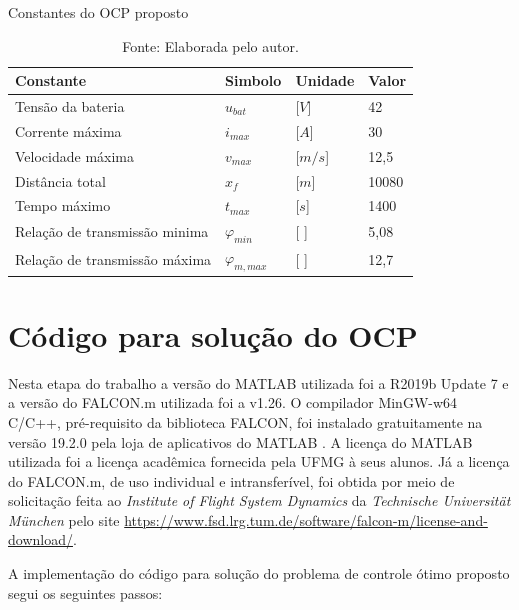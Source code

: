 \begin{table}[H]
	\centering
	\caption{Constantes do OCP proposto}
	\begin{tabular}{llll}
		\toprule
		\textbf{Constante} & \textbf{Simbolo} & \textbf{Unidade} & \textbf{Valor}\\
		\hline
		Tensão da bateria   & $u_{bat}$     & [$V$]    & 42    \\
        Corrente máxima     & $i_{max}$     & [$A$]    & 30    \\
        Velocidade máxima   & $v_{max}$     & [$m/s$]  & 12,5  \\  
        Distância total     & $x_f$         & [$m$]    & 10080 \\
        Tempo máximo        & $t_{max}$         & [$s$]    & 1400  \\
        Relação de transmissão minima         & $\varphi_{min}$   & [ ]    & 5,08  \\
        Relação de transmissão máxima         & $\varphi_{m,max}$   & [ ]    & 12,7 \\
		\bottomrule
	\end{tabular}
	\caption*{\footnotesize Fonte: Elaborada pelo autor.}
	\label{tab:constantes_OCP}
\end{table}

\section{Código para solução do OCP}
\label{sec:metodologia_codigos}

Nesta etapa do trabalho a versão do MATLAB  utilizada foi a R2019b Update 7 e a versão do FALCON.m utilizada foi a v1.26.
O compilador MinGW-w64 C/C++, pré-requisito da biblioteca FALCON, foi instalado gratuitamente na versão 19.2.0 pela loja de aplicativos do MATLAB . 
A licença do MATLAB  utilizada foi a licença acadêmica fornecida pela UFMG à seus alunos. Já a licença do FALCON.m, de uso individual e intransferível,
foi obtida por meio de solicitação feita ao \textit{Institute of Flight System Dynamics} da \textit{Technische Universit{\"a}t M{\"u}nchen} pelo site \url{https://www.fsd.lrg.tum.de/software/falcon-m/license-and-download/}.

A implementação do código para solução do problema de controle ótimo proposto segui os seguintes passos:

